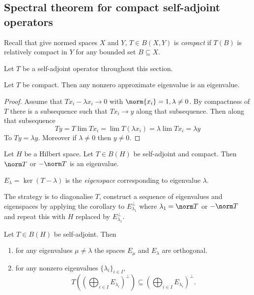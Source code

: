 \documentclass[a4paper]{article}
\begin{document}
\subsection{Spectral theorem for compact self-adjoint operators}

Recall that give normed spaces \(X\) and \(Y\), \(T \in B(X, Y)\) is \emph{compact} if \(T(B)\) is relatively compact in \(Y\) for any bounded set \(B \subseteq X\).

Let \(T\) be a self-adjoint operator throughout this section.

\begin{lemma}
  Let \(T\) be compact. Then any nonzero approximate eigenvalue is an eigenvalue.
\end{lemma}

\begin{proof}
  Assume that \(Tx_i - \lambda x_i \to 0\) with \(\norm{x_i} = 1, \lambda \neq 0\). By compactness of \(T\) there is a subsequence such that \(Tx_i \to y\) along that subsequence. Then along that subsequence
  \[
    Ty
    = T \lim Tx_i
    = \lim T(\lambda x_i)
    = \lambda \lim Tx_i
    = \lambda y
  \]
  To \(Ty = \lambda y\). Moreover if \(\lambda \neq 0\) then \(y \neq 0\).
\end{proof}

\begin{corollary}
  Let \(H\) be a Hilbert space. Let \(T \in B(H)\) be self-adjoint and compact. Then \(\norm T\) or \(- \norm T\) is an eigenvalue.
\end{corollary}

\begin{notation}
  \(E_\lambda = \ker (T - \lambda)\) is the \emph{eigenspace} corresponding to eigenvalue \(\lambda\).
\end{notation}

The strategy is to diagonalise \(T\), construct a sequence of eigenvalues and eigenspaces by applying the corollary to \(E_{\lambda_1}^\perp\) where \(\lambda_1 = \norm T\) or \(- \norm T\) and repeat this with \(H\) replaced by \(E_{\lambda_1}^\perp\).

\begin{lemma}
  Let \(T \in B(H)\) be self-adjoint. Then
  \begin{enumerate}
  \item for any eigenvalues \(\mu \neq \lambda\) the spaces \(E_\mu\) and \(E_\lambda\) are orthogonal.
  \item for any nonzero eigenvalues \(\{\lambda_i\}_{i \in I}\),
    \[
      T((\bigoplus_{i \in I} E_{\lambda_i})^\perp) \subseteq (\bigoplus_{i \in I} E_{\lambda_i})^\perp.
    \]
  \end{enumerate}
\end{lemma}
\end{document}
